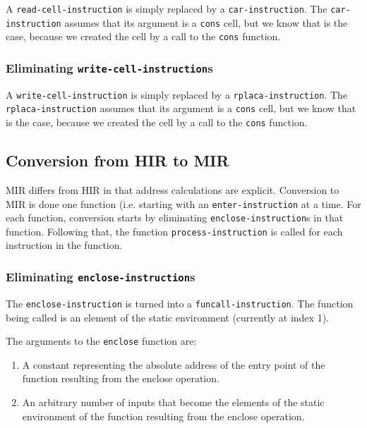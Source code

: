 A \texttt{read-cell-instruction} is simply replaced by a
\texttt{car-instruction}.  The \texttt{car-instruction} assumes that
its argument is a \texttt{cons} cell, but we know that is the case,
because we created the cell by a call to the \texttt{cons} function.

\subsubsection{Eliminating \texttt{write-cell-instruction}s}

A \texttt{write-cell-instruction} is simply replaced by a
\texttt{rplaca-instruction}.  The \texttt{rplaca-instruction} assumes
that its argument is a \texttt{cons} cell, but we know that is the
case, because we created the cell by a call to the \texttt{cons}
function.

\subsection{Conversion from HIR to MIR}

MIR differs from HIR in that address calculations are explicit.
Conversion to MIR is done one function (i.e. starting with an
\texttt{enter-instruction} at a time.  For each function, conversion
starts by eliminating \texttt{enclose-instruction}s in that function.
Following that, the function \texttt{process-instruction} is called
for each instruction in the function.

\subsubsection{Eliminating \texttt{enclose-instruction}s}

The \texttt{enclose-instruction} is turned into a
\texttt{funcall-instruction}.  The function being called is an element
of the static environment (currently at index 1).

The arguments to the \texttt{enclose} function are:

\begin{enumerate}
\item A constant representing the absolute address of the entry point
  of the function resulting from the enclose operation.
\item An arbitrary number of inputs that become the elements of the
  static environment of the function resulting from the enclose
  operation.
\end{enumerate}

